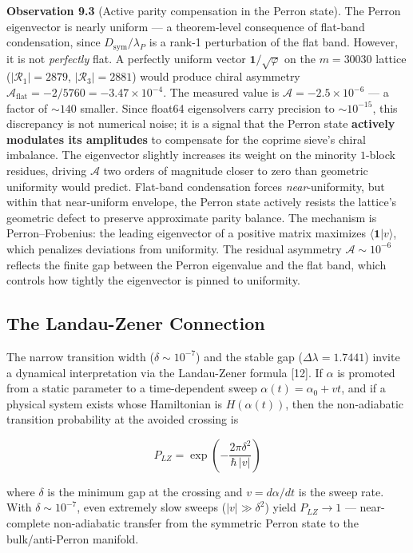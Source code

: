 \documentclass[11pt,letterpaper]{article}
\theoremstyle{definition}
\theoremstyle{remark}
\begin{document}
\textbf{Observation 9.3} (Active parity compensation in the Perron state). The Perron eigenvector is nearly uniform --- a theorem-level consequence of flat-band condensation, since $D_{\text{sym}}/\lambda_P$ is a rank-1 perturbation of the flat band. However, it is not \emph{perfectly} flat. A perfectly uniform vector $\mathbf{1}/\sqrt{\varphi}$ on the $m = 30030$ lattice ($|\mathcal{R}_1| = 2879$, $|\mathcal{R}_3| = 2881$) would produce chiral asymmetry $\mathcal{A}_{\text{flat}} = -2/5760 = -3.47 \times 10^{-4}$. The measured value is $\mathcal{A} = -2.5 \times 10^{-6}$ --- a factor of $\sim 140$ smaller. Since float64 eigensolvers carry precision to $\sim 10^{-15}$, this discrepancy is not numerical noise; it is a signal that the Perron state \textbf{actively modulates its amplitudes} to compensate for the coprime sieve's chiral imbalance. The eigenvector slightly increases its weight on the minority $1$-block residues, driving $\mathcal{A}$ two orders of magnitude closer to zero than geometric uniformity would predict. Flat-band condensation forces \emph{near}-uniformity, but within that near-uniform envelope, the Perron state actively resists the lattice's geometric defect to preserve approximate parity balance. The mechanism is Perron--Frobenius: the leading eigenvector of a positive matrix maximizes $\langle \mathbf{1} | v \rangle$, which penalizes deviations from uniformity. The residual asymmetry $\mathcal{A} \sim 10^{-6}$ reflects the finite gap between the Perron eigenvalue and the flat band, which controls how tightly the eigenvector is pinned to uniformity.

\subsection{The Landau-Zener Connection}\label{the-landau-zener-connection}

The narrow transition width ($\delta \sim 10^{-7}$) and the stable gap ($\Delta\lambda = 1.7441$) invite a dynamical interpretation via the Landau-Zener formula [12]. If $\alpha$ is promoted from a static parameter to a time-dependent sweep $\alpha(t) = \alpha_0 + vt$, and if a physical system exists whose Hamiltonian is $H(\alpha(t))$, then the non-adiabatic transition probability at the avoided crossing is

\[P_{LZ} = \exp\left(-\frac{2\pi \delta^2}{\hbar \, |v|}\right)\]

where $\delta$ is the minimum gap at the crossing and $v = d\alpha/dt$ is the sweep rate. With $\delta \sim 10^{-7}$, even extremely slow sweeps ($|v| \gg \delta^2$) yield $P_{LZ} \to 1$ --- near-complete non-adiabatic transfer from the symmetric Perron state to the bulk/anti-Perron manifold.
\end{document}
